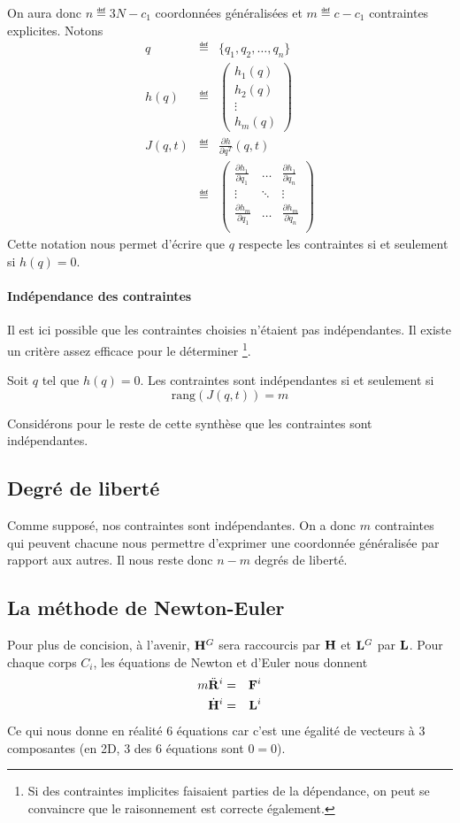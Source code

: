On aura donc $n \eqdef 3N - c_1$ coordonnées généralisées et $m \eqdef c - c_1$ contraintes explicites.
Notons
\begin{eqnarray*}
	q & \eqdef & \{q_1, q_2, \ldots, q_n\}\\
	h(q) & \eqdef & \begin{pmatrix}h_1(q)\\h_2(q)\\\vdots\\h_m(q)\end{pmatrix}\\
	J(q, t) & \eqdef & \frac{\partial h}{\partial q^T}(q, t)\\
	& \eqdef &
	\begin{pmatrix}
		\frac{\partial h_1}{\partial q_1} & \ldots & \frac{\partial h_1}{\partial q_n}\\
		\vdots & \ddots & \vdots\\
		\frac{\partial h_m}{\partial q_1} & \ldots & \frac{\partial h_m}{\partial q_n}\\
	\end{pmatrix}
\end{eqnarray*}
Cette notation nous permet d'écrire que $q$ respecte les contraintes si et seulement si $h(q) = 0$.

\paragraph{Indépendance des contraintes}
Il est ici possible que les contraintes choisies n'étaient pas indépendantes.
Il existe un critère assez efficace pour le déterminer
\footnote{Si des contraintes implicites faisaient parties de la dépendance, on peut se convaincre que le raisonnement est correcte également.}.

Soit $q$ tel que $h(q) = 0$.
Les contraintes sont indépendantes si et seulement si
\[ \mathrm{rang} (J(q, t)) = m \]

Considérons pour le reste de cette synthèse que les contraintes sont indépendantes.

\subsection{Degré de liberté}
Comme supposé, nos contraintes sont indépendantes.
On a donc $m$ contraintes qui peuvent chacune nous permettre d'exprimer une coordonnée généralisée par rapport aux autres.
Il nous reste donc $n - m$ degrés de liberté.

\subsection{La méthode de Newton-Euler}
Pour plus de concision, à l'avenir, ${\bf H}^G$ sera raccourcis par ${\bf H}$ et ${\bf L}^G$ par ${\bf L}$.
Pour chaque corps $C_i$, les équations de Newton et d'Euler nous donnent
\begin{eqnarray*}
	m\ddot{\bf R}^i &=& {\bf F}^i\\
	\dot{{\bf H}}^i &=& {\bf L}^i
\end{eqnarray*}
Ce qui nous donne en réalité 6 équations car c'est une égalité de vecteurs à 3 composantes (en 2D, 3 des 6 équations sont $0 = 0$).
